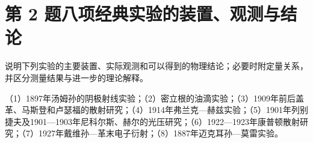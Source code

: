 \documentclass[UTF8,fontset=fandol,a4paper,11pt]{ctexart}
\begin{document}


\section*{第 2 题\quad 八项经典实验的装置、观测与结论}\label{q:2}


说明下列实验的主要装置、实际观测和可以得到的物理结论；必要时附定量关系，并区分测量结果与进一步的理论解释。

（1）1897年汤姆孙的阴极射线实验；（2）密立根的油滴实验；（3）1909年前后盖革、马斯登和卢瑟福的散射研究；（4）1914年弗兰克—赫兹实验；（5）1901年列别捷夫及1901—1903年尼科尔斯、赫尔的光压研究；（6）1922—1923年康普顿散射研究；（7）1927年戴维孙—革末电子衍射；（8）1887年迈克耳孙—莫雷实验。
\end{document}
